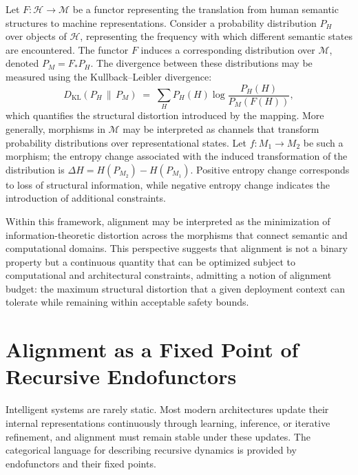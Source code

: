 \documentclass[12pt]{article}
\theoremstyle{definition}
\begin{document}
Let $F : \mathcal{H} \to \mathcal{M}$ be a functor representing the translation
from human semantic structures to machine representations. Consider a
probability distribution $P_H$ over objects of $\mathcal{H}$, representing the
frequency with which different semantic states are encountered. The functor $F$
induces a corresponding distribution over $\mathcal{M}$, denoted $P_M = F_* P_H$.
The divergence between these distributions may be measured using the
Kullback--Leibler divergence:
\begin{equation}
  D_{\mathrm{KL}}(P_H \,\|\, P_M)
  \;=\;
  \sum_H P_H(H) \log \frac{P_H(H)}{P_M(F(H))},
\end{equation}
which quantifies the structural distortion introduced by the mapping. More
generally, morphisms in $\mathcal{M}$ may be interpreted as channels that
transform probability distributions over representational states. Let $f : M_1
\to M_2$ be such a morphism; the entropy change associated with the induced
transformation of the distribution is $\Delta H = H(P_{M_2}) - H(P_{M_1})$.
Positive entropy change corresponds to loss of structural information, while
negative entropy change indicates the introduction of additional constraints.

Within this framework, alignment may be interpreted as the minimization of
information-theoretic distortion across the morphisms that connect semantic and
computational domains. This perspective suggests that alignment is not a binary
property but a continuous quantity that can be optimized subject to computational
and architectural constraints, admitting a notion of alignment budget: the
maximum structural distortion that a given deployment context can tolerate while
remaining within acceptable safety bounds.

\section{Alignment as a Fixed Point of Recursive Endofunctors}

Intelligent systems are rarely static. Most modern architectures update their
internal representations continuously through learning, inference, or iterative
refinement, and alignment must remain stable under these updates. The categorical
language for describing recursive dynamics is provided by endofunctors and their
fixed points.
\end{document}
